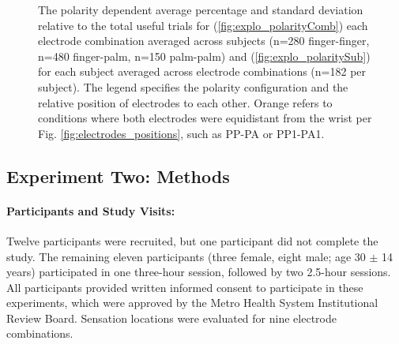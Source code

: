 \documentclass[10pt]{iopart}
\begin{document}
\begin{figure} [t]
    \centering
    \caption{The polarity dependent average percentage and standard deviation relative to the total useful trials for (\ref{fig:explo_polarityComb}) each electrode combination averaged across subjects (n=280 finger-finger, n=480 finger-palm, n=150 palm-palm) and (\ref{fig:explo_polaritySub}) for each subject averaged across electrode combinations (n=182 per subject). The legend specifies the polarity configuration and the relative position of electrodes to each other. Orange refers to conditions where both electrodes were equidistant from the wrist per Fig. \ref{fig:electrodes_positions}, such as PP-PA or PP1-PA1.
    }
    \label{fig:explo_polarity}
\end{figure}

\subsection{Experiment Two: Methods}

\paragraph{Participants and Study Visits:} Twelve participants were recruited, but one participant did not complete the study. The remaining eleven participants (three female, eight male; age 30 $\pm$ 14 years) participated in one three-hour session, followed by two 2.5-hour sessions. All participants provided written informed consent to participate in these experiments, which were approved by the Metro Health System Institutional Review Board. Sensation locations were evaluated for nine electrode combinations.
\end{document}
